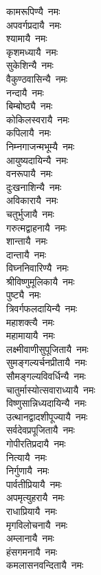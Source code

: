 \begin{multicols}{2}
\begin{flushleft}
कामरूपिण्यै~नमः\\
अपवर्गप्रदायै~नमः\\
श्यामायै~नमः\\
कृशमध्यायै~नमः\\
सुकेशिन्यै~नमः\\
वैकुण्ठवासिन्यै~नमः\\
नन्दायै~नमः\\
बिम्बोष्ठ्यै~नमः\\
कोकिलस्वरायै~नमः\\
कपिलायै~नमः\hfill{}‌\\
निम्नगाजन्मभूम्यै~नमः\\
आयुष्यदायिन्यै~नमः\\
वनरूपायै~नमः\\
दुःखनाशिन्यै~नमः\\
अविकारायै~नमः\\
चतुर्भुजायै~नमः\\
गरुत्मद्वाहनायै~नमः\\
शान्तायै~नमः\\
दान्तायै~नमः\\
विघ्ननिवारिण्यै~नमः\hfill{}‌\\
श्रीविष्णुमूलिकायै~नमः\\
पुष्ट्यै~नमः\\
त्रिवर्गफलदायिन्यै~नमः\\
महाशक्त्यै~नमः\\
महामायायै~नमः\\
लक्ष्मीवाणीसुपूजितायै~नमः\\
सुमङ्गल्यर्चनप्रीतायै~नमः\\
सौमङ्गल्यविवर्धिन्यै~नमः\\
चातुर्मास्योत्सवाराध्यायै~नमः\\
विष्णुसान्निध्यदायिन्यै~नमः\hfill{}‌\\
उत्थानद्वादशीपूज्यायै~नमः\\
सर्वदेवप्रपूजितायै~नमः\\
गोपीरतिप्रदायै~नमः\\
नित्यायै~नमः\\
निर्गुणायै~नमः\\
पार्वतीप्रियायै~नमः\\
अपमृत्युहरायै~नमः\\
राधाप्रियायै~नमः\\
मृगविलोचनायै~नमः\\
अम्लानायै~नमः\hfill{}‌\\
हंसगमनायै~नमः\\
कमलासनवन्दितायै~नमः\\

\end{flushleft}
\end{multicols}
